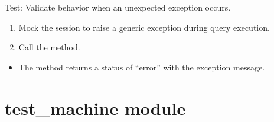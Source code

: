 \documentclass[letterpaper,10pt,english]{sphinxmanual}
\begin{document}
\begin{fulllineitems}
\label{\detokenize{test:test.test_family.test_list_families_unexpected_exception}}
\pysigstartsignatures
\pysiglinewithargsret
{}
{\sphinxparamcomma {}}
{}
\pysigstopsignatures
\sphinxAtStartPar
Test: Validate behavior when an unexpected exception occurs.
\begin{description}
\begin{enumerate}
%
\item {} 
\sphinxAtStartPar
Mock the session to raise a generic exception during query execution.

\item {} 
\sphinxAtStartPar
Call the  method.

\end{enumerate}

\begin{itemize}
\item {} 
\sphinxAtStartPar
The method returns a status of “error” with the exception message.

\end{itemize}

\end{description}

\end{fulllineitems}



\section{test\_machine module}
\label{\detokenize{test:module-test.test_machine}}\label{\detokenize{test:test-machine-module}}
\end{document}
